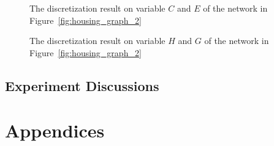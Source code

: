 \begin{figure}[ht]
      
  \caption{The discretization result on variable $C$ and $E$ of the network in Figure~\ref{fig:housing_graph_2}}
  \label{fig:housing_exp2_distr_3_5}
\end{figure}

\begin{figure}[ht]
      
  \caption{The discretization result on variable $H$ and $G$ of the network in Figure~\ref{fig:housing_graph_2}}
  \label{fig:housing_exp2_distr_8_5}
\end{figure}

\subsection{Experiment Discussions}
\label{subsec:discuss_exp}







\section*{Appendices}

